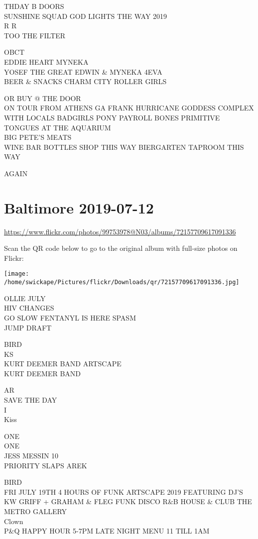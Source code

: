 \documentclass[10pt,letterpaper]{article}
\begin{document}
THDAY B DOORS\\
SUNSHINE SQUAD GOD LIGHTS THE WAY 2019\\
R R\\
TOO THE FILTER

OBCT\\
EDDIE HEART MYNEKA\\
YOSEF THE GREAT EDWIN \& MYNEKA 4EVA\\
BEER \& SNACKS CHARM CITY ROLLER GIRLS

OR BUY @ THE DOOR\\
ON TOUR FROM ATHENS GA FRANK HURRICANE GODDESS COMPLEX WITH LOCALS BADGIRLS PONY PAYROLL BONES PRIMITIVE TONGUES AT THE AQUARIUM\\
BIG PETE'S MEATS\\
WINE BAR BOTTLES SHOP THIS WAY BIERGARTEN TAPROOM THIS WAY

AGAIN


\section*{Baltimore 2019-07-12}

\url{https://www.flickr.com/photos/99753978@N03/albums/72157709617091336}

Scan the QR code below to go to the original album with full-size photos on Flickr:

\texttt{[image: /home/swickape/Pictures/flickr/Downloads/qr/72157709617091336.jpg]}


OLLIE JULY\\
HIV CHANGES\\
GO SLOW FENTANYL IS HERE SPASM\\
JUMP DRAFT

BIRD\\
KS\\
KURT DEEMER BAND ARTSCAPE\\
KURT DEEMER BAND

AR\\
SAVE THE DAY\\
I\\
Kiss

ONE\\
ONE\\
JESS MESSIN 10\\
PRIORITY SLAPS AREK

BIRD\\
FRI JULY 19TH 4 HOURS OF FUNK ARTSCAPE 2019 FEATURING DJ'S KW GRIFF + GRAHAM \& FLEG FUNK DISCO R\&B HOUSE \& CLUB THE METRO GALLERY\\
Clown\\
P\&Q HAPPY HOUR 5{-}7PM LATE NIGHT MENU 11 TILL 1AM
\end{document}
